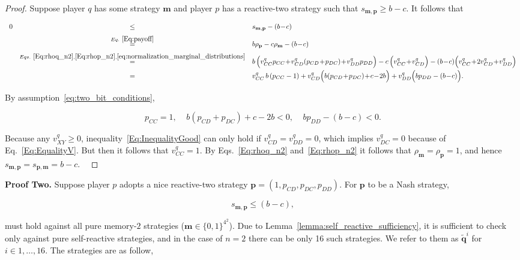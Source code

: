 \documentclass{article}
\theoremstyle{definition}
\begin{document}
\begin{proof}
Suppose player $q$ has some strategy $\mathbf{m}$ and player $p$ has a reactive-two
strategy such that $s_{\mathbf{m}, \mathbf{p}} \ge b\!-\!c$. It follows that

\begin{equation} \label{Eq:InequalityGood}
\begin{array}{rcl}
0 	&\le	&s_{\mathbf{m}, \mathbf{p}}-(b\!-\!c)\\[0.2cm]
	&\stackrel{Eq.~\eqref{Eq:payoff}}{=}	&b\rho_\mathbf{p} - c\rho_\mathbf{m}-(b\!-\!c)\\[0.2cm]
	&\stackrel{Eqs.~\eqref{Eq:rhoq_n2}, \eqref{Eq:rhop_n2}, \eqref{eq:normalization_marginal_distributions}}{=}	&b\,\Big( v^q_{CC} p_{CC} \!+\!  v^q_{CD}(p_{CD}\!+\!p_{DC}) \!+\! v^q_{DD} p_{DD}\Big) 
		- c\,\Big(v^q_{CC} \!+\! v^q_{CD}\Big) - (b\!-\!c)\Big(v^q_{CC} \!+\!  2v^q_{CD} \!+\! v^q_{DD}\Big)\\[0.2cm]
	&=	&v^q_{CC} \,b\,(p_{CC}-1) + v^q_{CD}\Big(b(p_{CD}\!+\!p_{DC})\!+\!c\!-\!2b\Big) + v^q_{DD}\Big(bp_{DD}-(b\!-\!c)\Big).
\end{array}
\end{equation}

By assumption~\eqref{eq:two_bit_conditions},

\begin{equation}
p_{CC}=1,~~~~~b(p_{CD}\!+\!p_{DC})\!+\!c\!-\!2b<0,~~~~~bp_{DD}-(b\!-\!c)<0.
\end{equation}

Because any $v^q_{XY}\!\ge\!0$, inequality~\eqref{Eq:InequalityGood} can only
hold if $v^q_{CD}\!=\!v^q_{DD}\!=\!0$, which implies $v^q_{DC}\!=\!0$ because of
Eq.~\eqref{Eq:EqualityV}. But then it follows that $v^q_{CC}\!=\!1$. By
Eqs.~\eqref{Eq:rhoq_n2} and~\eqref{Eq:rhop_n2} it follows that
$\rho_\mathbf{m}\!=\!\rho_\mathbf{p}\!=\!1$, and hence
$s_{\mathbf{m}, \mathbf{p}}\!=\!s_{\mathbf{p}, \mathbf{m}}\!=\!b\!-\!c$. 
\
\end{proof}

{\bf Proof Two.} Suppose player $p$ adopts a nice reactive-two strategy
$\mathbf{p}\!=\!(1, p_{CD}, p_{DC}, p_{DD})$. For $\mathbf{p}$ to be a Nash
strategy,

\begin{equation}\label{Eq:NashReactive}
  s_{\mathbf{m}, \mathbf{p}} \leq (b - c),
\end{equation}

must hold against all pure memory-\(2\) strategies (\(\mathbf{m} \in \{0, 1\}^{4
^ 2}\)). Due to Lemma~\ref{lemma:self_reactive_sufficiency}, it is sufficient to
check only against pure self-reactive strategies, and in the case of $n=2$ there
can be only 16 such strategies. We refer to them as $\mathbf{\tilde{q}}^{i}$ for
$i \in 1, \dots, 16$. The strategies are as follow,
\end{document}
